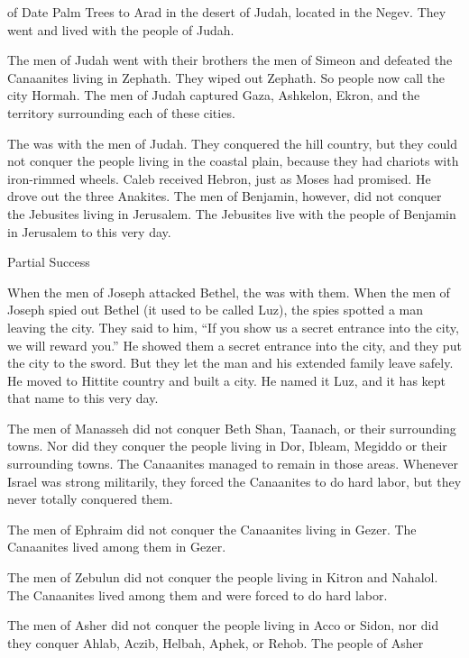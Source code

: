 {of Date
Palm Trees to Arad
in the desert
of Judah,
located
in the Negev.
They went
and lived
with
the people
of Judah.
\par }{\PP {}The men of Judah
went
with
their brothers
the men of Simeon
and defeated
the Canaanites
living
in Zephath.
They wiped out
Zephath. So people now call
the city
Hormah.
The men of Judah
captured
Gaza,
Ashkelon,
Ekron,
and
the territory surrounding each of these cities.
\par }{\PP {}The
{}
was with
the men of Judah.
They conquered
the hill country,
but
they could not
conquer
the
people living
in the coastal
plain, because
they had chariots
with iron-rimmed wheels.
Caleb
received Hebron,
just
as Moses
had promised.
He drove
out the three
Anakites.
The men
of Benjamin,
however,
did not
conquer
the Jebusites
living
in Jerusalem.
The Jebusites
live
with
the people of Benjamin
in Jerusalem
to
this
very
day.
\par }{\SH Partial Success
\par }{\PP {}When
the men
of Joseph
attacked
Bethel,
the {}
was with them.
When
the men
of Joseph
spied
out Bethel
(it used to be called
Luz),
the spies
spotted
a man
leaving
the city.
They said
to him, “If you show
us
a secret
entrance
into the city,
we will reward you.”
He showed
them
a secret entrance
into the city,
and they put
the city
to the sword.
But they let the
man
and his extended
family
leave safely.
He moved
to Hittite
country
and built
a city.
He named
it Luz,
and it has kept that
name
to
this
very
day.
\par }{\PP {}The men of Manasseh
did not
conquer
Beth Shan,
Taanach,
or their surrounding towns.
Nor did they conquer
the people living
in Dor,
Ibleam,
Megiddo
or their surrounding towns.
The Canaanites
managed
to remain
in those
areas.
Whenever
Israel
was strong
militarily, they forced
the Canaanites
to do hard labor,
but they never
totally
conquered them.
\par }{\PP {}The men of Ephraim
did not
conquer
the Canaanites
living
in Gezer.
The Canaanites
lived
among
them in Gezer.
\par }{\PP {}The men of Zebulun
did not
conquer
the people living
in Kitron
and Nahalol.
The Canaanites
lived
among
them and were
forced to do hard labor.
\par }{\PP {}The men of Asher
did not
conquer
the people living
in
Acco
or Sidon,
nor did they conquer Ahlab,
Aczib,
Helbah,
Aphek,
or Rehob.
The people of Asher
}
